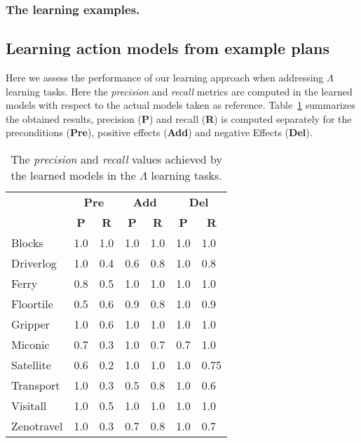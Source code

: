 \documentclass[letterpaper]{article} %
\begin{document}
\subsubsection{The learning examples.}


\subsection{Learning action models from example plans}
Here we assess the performance of our learning approach when addressing $\Lambda$ learning tasks. Here the {\em precision} and {\em recall} metrics are computed in the learned models with respect to the actual models taken as reference. Table~\ref{tab:results_plans} summarizes the obtained results, precision ({\bf P}) and recall ({\bf R}) is computed separately for the preconditions ({\bf Pre}), positive effects ({\bf Add}) and negative Effects ({\bf Del}). 

\begin{table}[hbt!]
	\begin{small}
	\begin{center}
		\begin{tabular}{l|l|l|l|l|l|l|}
			 & \multicolumn{2}{|c|}{\bf Pre} & \multicolumn{2}{|c|}{\bf Add} & \multicolumn{2}{|c|}{\bf Del}  \\ \cline{2-7}			 
			  & \multicolumn{1}{|c|}{\bf P} & \multicolumn{1}{|c|}{\bf R} & \multicolumn{1}{|c|}{\bf P} & \multicolumn{1}{|c|}{\bf R} & \multicolumn{1}{|c|}{\bf P} & \multicolumn{1}{|c|}{\bf R} \\
			\hline
			Blocks & 1.0 & 1.0 & 1.0 & 1.0 & 1.0 & 1.0 \\
			Driverlog & 1.0 & 0.4 & 0.6 & 0.8 & 1.0 & 0.8 \\
			Ferry & 0.8 & 0.5 & 1.0 & 1.0 & 1.0 & 1.0 \\
			Floortile & 0.5 & 0.6 & 0.9 & 0.8 & 1.0 & 0.9 \\
			Gripper & 1.0 & 0.6 & 1.0 & 1.0 & 1.0 & 1.0 \\
			Miconic & 0.7 & 0.3 & 1.0 & 0.7 & 0.7 & 1.0 \\
			Satellite & 0.6 & 0.2 & 1.0 & 1.0 & 1.0 & 0.75 \\
			Transport & 1.0 & 0.3 & 0.5 & 0.8 & 1.0 & 0.6 \\
			Visitall & 1.0 & 0.5 & 1.0 & 1.0 & 1.0 & 1.0 \\
			Zenotravel & 1.0 & 0.3 & 0.7 & 0.8 & 1.0 & 0.7
		\end{tabular}
	\end{center}
	\end{small}
\caption{\small The {\em precision} and {\em recall} values achieved by the learned models in the $\Lambda$ learning tasks.}
\label{tab:results_plans}
\end{table}
\end{document}
